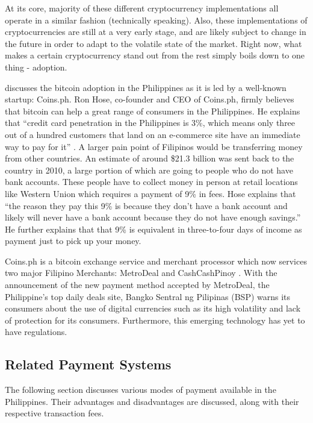 \documentclass{acm_proc_article-sp}
\begin{document}
At its core, majority of these different cryptocurrency implementations all operate in a similar fashion (technically speaking). Also, these implementations of cryptocurrencies are still at a very early stage, and are likely subject to change in the future in order to adapt to the volatile state of the market. Right now, what makes a certain cryptocurrency stand out from the rest simply boils down to one thing - adoption.

\cite{Coins.ph:06292014} discusses the bitcoin adoption in the Philippines as it is led by a well-known startup: Coins.ph. Ron Hose, co-founder and CEO of Coins.ph, firmly believes that bitcoin can help a great range of consumers in the Philippines. He explains that ``credit card penetration in the Philippines is 3\%, which means only three out of a hundred customers that land on an e-commerce site have an immediate way to pay for it'' \cite{Coins.ph:06292014}. A larger pain point of Filipinos would be transferring money from other countries. An estimate of around \$21.3 billion was sent back to the country in 2010, a large portion of which are going to people who do not have bank accounts. These people have to collect money in person at retail locations like Western Union which requires a payment of 9\% in fees. Hose explains that ``the reason they pay this 9\% is because they don't have a bank account and likely will never have a bank account because they do not have enough savings.'' He further explains that that 9\% is equivalent in three-to-four days of income as payment just to pick up your money.

Coins.ph is a bitcoin exchange service and merchant processor which now services two major Filipino Merchants: MetroDeal and CashCashPinoy \cite{Coins.ph:03202014}. With the announcement of the new payment method accepted by MetroDeal, the Philippine's top daily deals site, Bangko Sentral ng Pilipinas (BSP) warns its consumers about the use of digital currencies such as its high volatility and lack of protection for its consumers. Furthermore, this emerging technology has yet to have regulations.

\subsection{Related Payment Systems}
The following section discusses various modes of payment available in the Philippines. Their advantages and disadvantages are discussed, along with their respective transaction fees.
\end{document}
